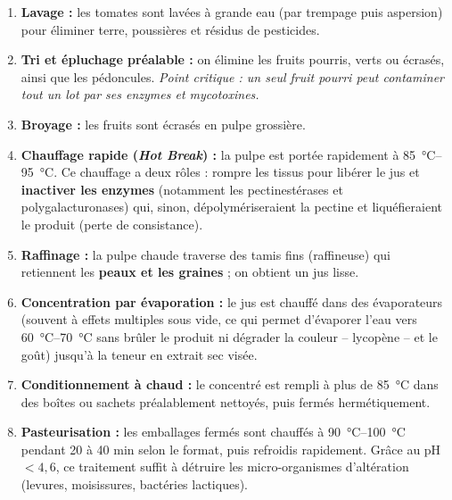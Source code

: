 \documentclass[11pt]{article}
\begin{document}
\begin{methode}
\begin{enumerate}
\item \textbf{Lavage :} les tomates sont lavées à grande eau (par trempage puis aspersion) pour éliminer terre, poussières et résidus de pesticides.
\item \textbf{Tri et épluchage préalable :} on élimine les fruits pourris, verts ou écrasés, ainsi que les pédoncules. \emph{Point critique : un seul fruit pourri peut contaminer tout un lot par ses enzymes et mycotoxines.}
\item \textbf{Broyage :} les fruits sont écrasés en pulpe grossière.
\item \textbf{Chauffage rapide (\emph{Hot Break}) :} la pulpe est portée rapidement à \SI{85}{\celsius}--\SI{95}{\celsius}. Ce chauffage a deux rôles : rompre les tissus pour libérer le jus et \textbf{inactiver les enzymes} (notamment les pectinestérases et polygalacturonases) qui, sinon, dépolymériseraient la pectine et liquéfieraient le produit (perte de consistance).
\item \textbf{Raffinage :} la pulpe chaude traverse des tamis fins (raffineuse) qui retiennent les \textbf{peaux et les graines} ; on obtient un jus lisse.
\item \textbf{Concentration par évaporation :} le jus est chauffé dans des évaporateurs (souvent à effets multiples sous vide, ce qui permet d'évaporer l'eau vers \SI{60}{\celsius}--\SI{70}{\celsius} sans brûler le produit ni dégrader la couleur -- lycopène -- et le goût) jusqu'à la teneur en extrait sec visée.
\item \textbf{Conditionnement à chaud :} le concentré est rempli à plus de \SI{85}{\celsius} dans des boîtes ou sachets préalablement nettoyés, puis fermés hermétiquement.
\item \textbf{Pasteurisation :} les emballages fermés sont chauffés à \SI{90}{\celsius}--\SI{100}{\celsius} pendant 20 à 40 min selon le format, puis refroidis rapidement. Grâce au pH $< 4,6$, ce traitement suffit à détruire les micro-organismes d'altération (levures, moisissures, bactéries lactiques).
\end{enumerate}
\end{methode}
\end{document}
